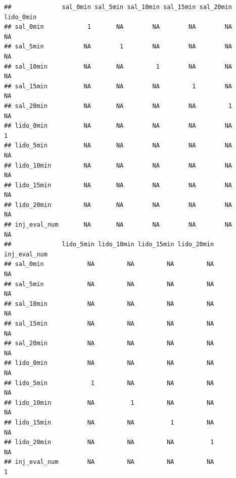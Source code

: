 \documentclass[
]{article}
\begin{document}
\begin{verbatim}
##              sal_0min sal_5min sal_10min sal_15min sal_20min lido_0min
## sal_0min            1       NA        NA        NA        NA        NA
## sal_5min           NA        1        NA        NA        NA        NA
## sal_10min          NA       NA         1        NA        NA        NA
## sal_15min          NA       NA        NA         1        NA        NA
## sal_20min          NA       NA        NA        NA         1        NA
## lido_0min          NA       NA        NA        NA        NA         1
## lido_5min          NA       NA        NA        NA        NA        NA
## lido_10min         NA       NA        NA        NA        NA        NA
## lido_15min         NA       NA        NA        NA        NA        NA
## lido_20min         NA       NA        NA        NA        NA        NA
## inj_eval_num       NA       NA        NA        NA        NA        NA
##              lido_5min lido_10min lido_15min lido_20min inj_eval_num
## sal_0min            NA         NA         NA         NA           NA
## sal_5min            NA         NA         NA         NA           NA
## sal_10min           NA         NA         NA         NA           NA
## sal_15min           NA         NA         NA         NA           NA
## sal_20min           NA         NA         NA         NA           NA
## lido_0min           NA         NA         NA         NA           NA
## lido_5min            1         NA         NA         NA           NA
## lido_10min          NA          1         NA         NA           NA
## lido_15min          NA         NA          1         NA           NA
## lido_20min          NA         NA         NA          1           NA
## inj_eval_num        NA         NA         NA         NA            1
\end{verbatim}
\end{document}
